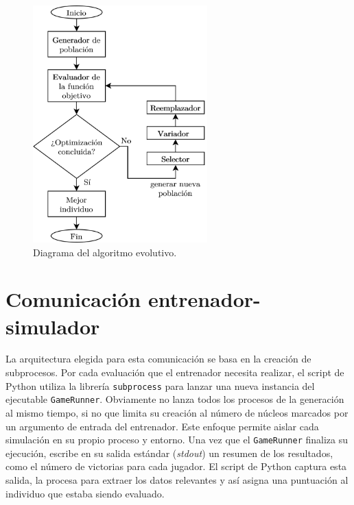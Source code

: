 \begin{figure}[H]
	\centering
	\includegraphics[width=0.6\textwidth]{img/diagrama_algoritmo.png}
	\caption{Diagrama del algoritmo evolutivo.}
	\label{fig:diagrama_algoritmo}
\end{figure}


\section{Comunicación entrenador-simulador} \label{sec:comunicacion_entrenador_simulador}

La arquitectura elegida para esta comunicación se basa en la creación de subprocesos. Por cada evaluación que el entrenador necesita realizar, el script de Python utiliza la librería \texttt{subprocess} para lanzar una nueva instancia del ejecutable \texttt{GameRunner}. Obviamente no lanza todos los procesos de la generación al mismo tiempo, si no que limita su creación al número de núcleos marcados por un argumento de entrada del entrenador. Este enfoque permite aislar cada simulación en su propio proceso y entorno. Una vez que el \texttt{GameRunner} finaliza su ejecución, escribe en su salida estándar (\textit{stdout}) un resumen de los resultados, como el número de victorias para cada jugador. El script de Python captura esta salida, la procesa para extraer los datos relevantes y así asigna una puntuación al individuo que estaba siendo evaluado.

